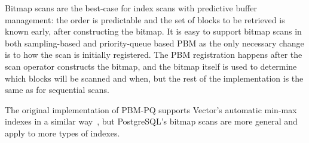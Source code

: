 Bitmap scans are the best-case for index scans with predictive buffer management: the order is predictable and the set of blocks to be retrieved is known early, after constructing the bitmap. It is easy to support bitmap scans in both sampling-based and priority-queue based PBM as the only necessary change is to how the scan is initially registered. The PBM registration happens after the scan operator constructs the bitmap, and the bitmap itself is used to determine which blocks will be scanned and when, but the rest of the implementation is the same as for sequential scans.

The original implementation of PBM-PQ supports Vector's automatic min-max indexes in a similar way~\cite{pbm}, but PostgreSQL's bitmap scans are more general and apply to more types of indexes.






